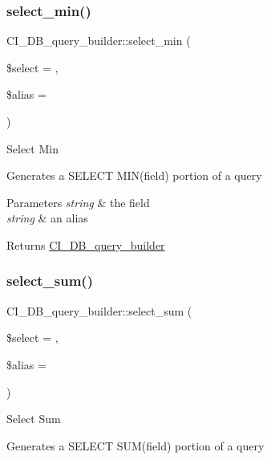 \subsubsection{\texorpdfstring{select\+\_\+min()}{select\_min()}}
{\footnotesize\ttfamily C\+I\+\_\+\+D\+B\+\_\+query\+\_\+builder\+::select\+\_\+min (\begin{DoxyParamCaption}\item[{}]{\$select = {\ttfamily \textquotesingle{}\textquotesingle{}},  }\item[{}]{\$alias = {\ttfamily \textquotesingle{}\textquotesingle{}} }\end{DoxyParamCaption})}

Select Min

Generates a S\+E\+L\+E\+CT M\+I\+N(field) portion of a query


\begin{DoxyParams}{Parameters}
{\em string} & the field \\
\hline
{\em string} & an alias \\
\hline
\end{DoxyParams}
\begin{DoxyReturn}{Returns}
\mbox{\hyperlink{class_c_i___d_b__query__builder}{C\+I\+\_\+\+D\+B\+\_\+query\+\_\+builder}} 
\end{DoxyReturn}
\mbox{\label{class_c_i___d_b__query__builder_a498b5c912dbdd9e27cf0589fd8750afb}} 
\subsubsection{\texorpdfstring{select\+\_\+sum()}{select\_sum()}}
{\footnotesize\ttfamily C\+I\+\_\+\+D\+B\+\_\+query\+\_\+builder\+::select\+\_\+sum (\begin{DoxyParamCaption}\item[{}]{\$select = {\ttfamily \textquotesingle{}\textquotesingle{}},  }\item[{}]{\$alias = {\ttfamily \textquotesingle{}\textquotesingle{}} }\end{DoxyParamCaption})}

Select Sum

Generates a S\+E\+L\+E\+CT S\+U\+M(field) portion of a query


